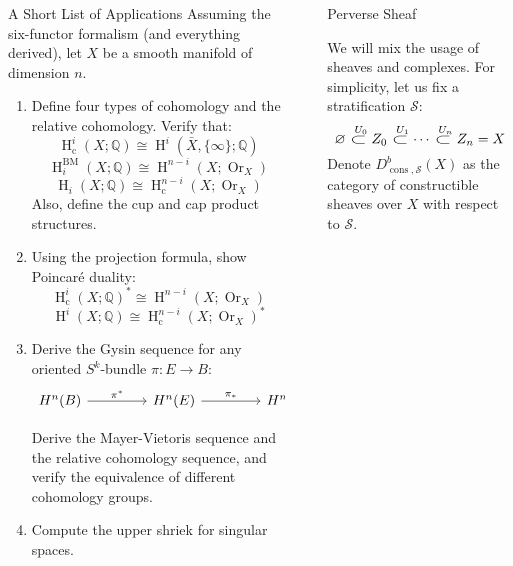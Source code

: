 \documentclass[final]{beamer}
\newlength{\sepwidth}
\newlength{\colwidth}
\newcommand{\separatorcolumn}{\begin{column}{\sepwidth}\end{column}}
\DeclareMathOperator{\Hcohom}{\operatorname{H}}
\DeclareMathOperator{\BM}{\operatorname{BM}}
\DeclareMathOperator{\cpt}{\operatorname{c}}
\DeclareMathOperator{\Or}{\operatorname{Or}}
\DeclareMathOperator{\constructable}{\operatorname{cons}}
\begin{document}
\begin{frame}[t]
\begin{columns}[t]
\begin{column}{\colwidth}
\begin{alertblock}{A Short List of Applications}
Assuming the six-functor formalism (and everything derived), let \( X \) be a smooth manifold of dimension \( n \).

\begin{enumerate}

\item Define four types of cohomology and the relative cohomology.
   Verify that:
$$\Hcohom^i_{\cpt}(X;\mathbb{Q}) \cong \Hcohom^i\left(\bar{X}, \{\infty \};\mathbb{Q}\right)$$
$$\Hcohom_i^{\BM}(X;\mathbb{Q}) \cong \Hcohom^{n-i}(X; \Or_X)$$
$$\Hcohom_i(X;\mathbb{Q}) \cong \Hcohom^{n-i}_{\cpt}(X; \Or_X)$$
  Also, define the cup and cap product structures.

\item Using the projection formula, show Poincaré duality:
$$\Hcohom^i_{\cpt}(X;\mathbb{Q})^* \cong \Hcohom^{n-i}(X; \Or_X)$$
$$\Hcohom^i(X;\mathbb{Q}) \cong \Hcohom^{n-i}_{\cpt}(X; \Or_X)^*$$


\item Derive the Gysin sequence for any oriented \( S^k \)-bundle \( \pi: E \longrightarrow B \):
\[\begin{tikzcd}[ampersand replacement=\&, column sep = 15mm]
	{H^n(B)} \& {H^n(E)} \& {H^{n-k}(B)} \& {}
	\arrow["{\pi^*}", from=1-1, to=1-2]
	\arrow["{\pi_*}", from=1-2, to=1-3]
	\arrow["{+1}", from=1-3, to=1-4]
	\arrow["{eu_{\pi}}"', from=1-3, to=1-4]
\end{tikzcd}\]

   Derive the Mayer-Vietoris sequence and the relative cohomology sequence, and verify the equivalence of different cohomology groups.

\item Compute the upper shriek for singular spaces.
\end{enumerate}


  \end{alertblock}

\end{column}

\separatorcolumn

\begin{column}{\colwidth}

  \begin{block}{Perverse Sheaf}

We will mix the usage of sheaves and complexes. For simplicity, let us fix a stratification $\mathcal{S}$:
\newcommand\largesubset{\mathrel{\scalebox{1.5}[1]{\(\subset\)}}}
$$\varnothing \overset{\;\,U_0}{\largesubset} Z_0 \overset{\;\,U_1}{\largesubset}\cdots  \overset{\;\,U_n}{\largesubset} Z_n = X$$
Denote $D_{\constructable,\mathcal{S}}^{b}(X)$ as the category of constructible sheaves over $X$ with respect to $\mathcal{S}$.


\end{block}
\end{column}
\end{columns}
\end{frame}
\end{document}

